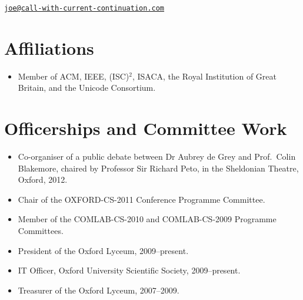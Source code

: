 \documentclass[12pt,twoside,letterpaper]{article}
\begin{document}


\newpage


\vspace*{-11mm}\hfill\href{mailto:joe@call-with-current-continuation.com}%
{\nolinkurl{joe@call-with-current-continuation.com}}

\vspace{-5mm}
\section*{Affiliations}
\vspace{-2mm}
\begin{itemize}
	\item Member of ACM, IEEE, (ISC)$^2$, ISACA, the Royal Institution
		of Great Britain, and the Unicode Consortium.
\end{itemize}

\vspace{-8mm}
\section*{Officerships and Committee Work}
\vspace{-2mm}
\begin{itemize}
	\item Co-organiser of a public debate between Dr Aubrey de Grey
		and Prof.\ Colin Blakemore, chaired by Professor Sir Richard
		Peto, in the Sheldonian Theatre, Oxford, 2012.
	\item Chair of the OXFORD-CS-2011 Conference Programme Committee.
	\item Member of the COMLAB-CS-2010 and COMLAB-CS-2009 Programme
		Committees.
	\item President of the Oxford Lyceum, 2009--present.
	\item IT Officer, Oxford University Scientific Society, 2009--present.
	\item Treasurer of the Oxford Lyceum, 2007--2009.
\end{itemize}


\vspace{-8mm}
\end{document}

